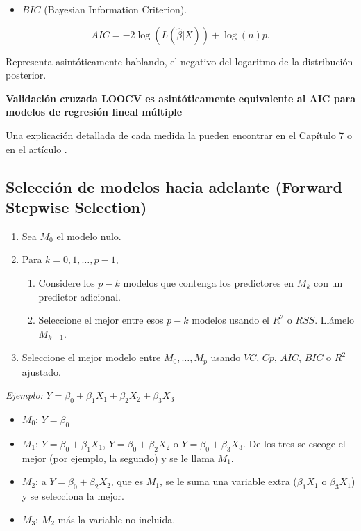 \documentclass[
  12pt,
]{book}
\providecommand{\tightlist}{%
  \setlength{\itemsep}{0pt}\setlength{\parskip}{0pt}}
\theoremstyle{definition}
\theoremstyle{definition}
\theoremstyle{definition}
\theoremstyle{remark}
\begin{document}
\begin{itemize}
\tightlist
\item
  \(BIC\) (Bayesian Information Criterion).
\end{itemize}

\[
AIC = -2\log(L(\hat{\beta} \vert X)) + \log(n)p. 
\]

Representa asintóticamente hablando, el negativo del logaritmo de la distribución posterior.

\textbf{Validación cruzada LOOCV es asintóticamente equivalente al AIC para modelos de regresión lineal múltiple \autocite{StoneAsymptotic1977}}

Una explicación detallada de cada medida la pueden encontrar en el Capítulo 7 \autocite{Hastie2009a} o en el artículo \autocite{CavanaughAkaike2019}.

\hypertarget{selecciuxf3n-de-modelos-hacia-adelante-forward-stepwise-selection}{%
\subsection{\texorpdfstring{Selección de modelos hacia adelante (\textbf{Forward Stepwise Selection})}{Selección de modelos hacia adelante (Forward Stepwise Selection)}}\label{selecciuxf3n-de-modelos-hacia-adelante-forward-stepwise-selection}}

\begin{enumerate}
\def\labelenumi{\arabic{enumi}.}
\tightlist
\item
  Sea \(M_0\) el modelo nulo.
\item
  Para \(k=0,1,\dots,p-1\),

  \begin{enumerate}
  \def\labelenumii{\alph{enumii}.}
  \tightlist
  \item
    Considere los \(p-k\) modelos que contenga los predictores en \(M_k\) con un predictor adicional.
  \item
    Seleccione el mejor entre esos \(p-k\) modelos usando el \(R^2\) o \(RSS\). Llámelo \(M_{k+1}\).
  \end{enumerate}
\item
  Seleccione el mejor modelo entre \(M_0,\dots, M_p\) usando \(VC\), \(Cp\), \(AIC\), \(BIC\) o \(R^2\) ajustado.
\end{enumerate}

\emph{Ejemplo:} \(Y=\beta_0+\beta_1X_1+\beta_2X_2+\beta_3X_3\)

\begin{itemize}
\item
  \(M_0\): \(Y = \beta_0\)
\item
  \(M_1\): \(Y = \beta_0+\beta_1X_1\), \(Y = \beta_0+\beta_2X_2\) o \(Y = \beta_0+\beta_3X_3\). De los tres se escoge el mejor (por ejemplo, la segundo) y se le llama \(M_1\).
\item
  \(M_2\): a \(Y = \beta_0+\beta_2X_2\), que es \(M_1\), se le suma una variable extra (\(\beta_1X_1\) o \(\beta_3X_1\)) y se selecciona la mejor.
\item
  \(M_3\): \(M_2\) más la variable no incluida.
\end{itemize}
\end{document}
